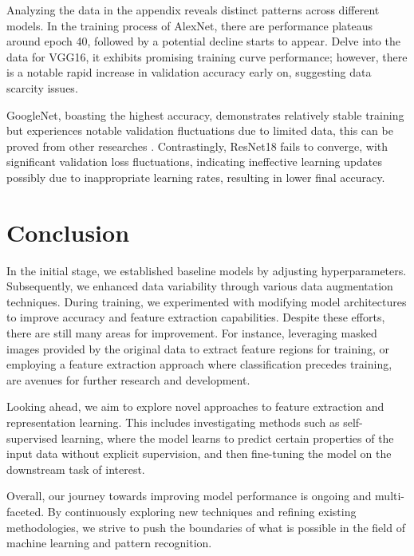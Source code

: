 \documentclass[final,5p,times,twocolumn,sort&compress]{elsarticle}
\begin{document}
Analyzing the data in the appendix reveals distinct patterns across different models.  In the training process of AlexNet, there are performance plateaus around epoch 40, followed by a potential decline starts to appear. Delve into the data for VGG16, it exhibits promising training curve performance; however, there is a notable rapid increase in validation accuracy early on, suggesting data scarcity issues.

GoogleNet, boasting the highest accuracy, demonstrates relatively stable training but experiences notable validation fluctuations due to limited data, this can be proved from other researches \cite{gheflati2022vision}. Contrastingly, ResNet18 fails to converge, with significant validation loss fluctuations, indicating ineffective learning updates possibly due to inappropriate learning rates, resulting in lower final accuracy.

\section{Conclusion}
\label{Conclusion}
In the initial stage, we established baseline models by adjusting hyperparameters. Subsequently, we enhanced data variability through various data augmentation techniques. During training, we experimented with modifying model architectures to improve accuracy and feature extraction capabilities. Despite these efforts, there are still many areas for improvement. For instance, leveraging masked images provided by the original data to extract feature regions for training, or employing a feature extraction approach where classification precedes training, are avenues for further research and development.

Looking ahead, we aim to explore novel approaches to feature extraction and representation learning. This includes investigating methods such as self-supervised learning, where the model learns to predict certain properties of the input data without explicit supervision, and then fine-tuning the model on the downstream task of interest.

Overall, our journey towards improving model performance is ongoing and multi-faceted. By continuously exploring new techniques and refining existing methodologies, we strive to push the boundaries of what is possible in the field of machine learning and pattern recognition.



\end{document}
